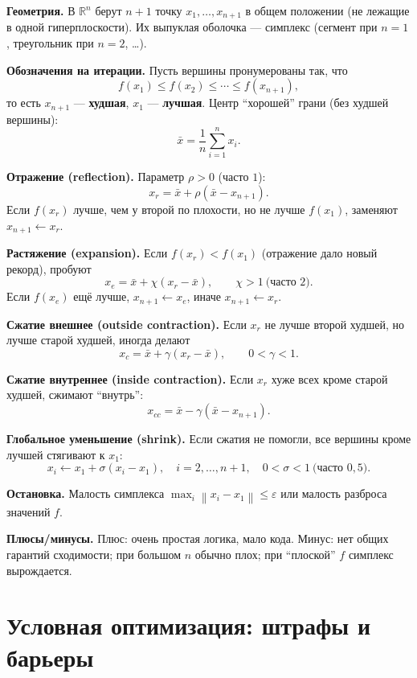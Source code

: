 \documentclass[12pt,a4paper]{article}
\newcommand{\R}{\mathbb{R}}
\newcommand{\norm}[1]{\left\lVert #1\right\rVert}
\begin{document}
\textbf{Геометрия.} В \(\R^n\) берут \(n+1\) точку \(x_1,\ldots,x_{n+1}\) в общем положении (не лежащие в одной гиперплоскости). Их выпуклая оболочка --- симплекс (сегмент при \(n=1\), треугольник при \(n=2\), \ldots).

\textbf{Обозначения на итерации.} Пусть вершины пронумерованы так, что
\[
  f(x_1)\le f(x_2)\le\cdots\le f(x_{n+1}),
\]
то есть \(x_{n+1}\) --- \textbf{худшая}, \(x_1\) --- \textbf{лучшая}. Центр ``хорошей'' грани (без худшей вершины):
\[
  \bar x=\frac{1}{n}\sum_{i=1}^n x_i.
\]

\textbf{Отражение (reflection).} Параметр \(\rho>0\) (часто \(1\)):
\[
  x_r=\bar x+\rho(\bar x-x_{n+1}).
\]
Если \(f(x_r)\) лучше, чем у второй по плохости, но не лучше \(f(x_1)\), заменяют \(x_{n+1}\leftarrow x_r\).

\textbf{Растяжение (expansion).} Если \(f(x_r)<f(x_1)\) (отражение дало новый рекорд), пробуют
\[
  x_e=\bar x+\chi(x_r-\bar x),\qquad \chi>1\ \text{(часто }2\text{)}.
\]
Если \(f(x_e)\) ещё лучше, \(x_{n+1}\leftarrow x_e\), иначе \(x_{n+1}\leftarrow x_r\).

\textbf{Сжатие внешнее (outside contraction).} Если \(x_r\) не лучше второй худшей, но лучше старой худшей, иногда делают
\[
  x_c=\bar x+\gamma(x_r-\bar x),\qquad 0<\gamma<1.
\]

\textbf{Сжатие внутреннее (inside contraction).} Если \(x_r\) хуже всех кроме старой худшей, сжимают ``внутрь'':
\[
  x_{cc}=\bar x-\gamma(\bar x-x_{n+1}).
\]

\textbf{Глобальное уменьшение (shrink).} Если сжатия не помогли, все вершины кроме лучшей стягивают к \(x_1\):
\[
  x_i\leftarrow x_1+\sigma(x_i-x_1),\quad i=2,\ldots,n+1,\quad 0<\sigma<1\ \text{(часто }0{,}5\text{)}.
\]

\textbf{Остановка.} Малость симплекса \(\max_i \norm{x_i-x_1}\le\varepsilon\) или малость разброса значений \(f\).

\textbf{Плюсы/минусы.} Плюс: очень простая логика, мало кода. Минус: нет общих гарантий сходимости; при большом \(n\) обычно плох; при ``плоской'' \(f\) симплекс вырождается.

\section[Штрафы и барьеры]{Условная оптимизация: штрафы и барьеры}
\end{document}
